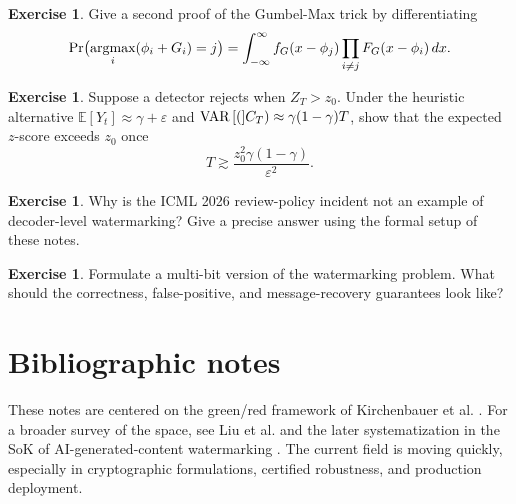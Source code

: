 \documentclass[11pt]{article}
\theoremstyle{definition}
\newtheorem{exercise}[theorem]{Exercise}
\newcommand{\PrK}{\Pr}
\newcommand{\E}{\mathbb{E}}
\newcommand{\1}{\mathbf{1}}
\begin{document}
\begin{exercise}
Give a second proof of the Gumbel-Max trick by differentiating
\[
\PrK\bigl(\argmax_i (\phi_i+G_i)=j\bigr)
= \int_{-\infty}^{\infty} f_G(x-\phi_j) \prod_{i\ne j} F_G(x-\phi_i)\,dx.
\]
\end{exercise}

\begin{exercise}
Suppose a detector rejects when $Z_T > z_0$. Under the heuristic alternative $\E[Y_t]\approx \gamma+\varepsilon$ and $\Var(C_T)\approx \gamma(1-\gamma)T$, show that the expected $z$-score exceeds $z_0$ once
\[
T \gtrsim \frac{z_0^2\gamma(1-\gamma)}{\varepsilon^2}.
\]
\end{exercise}

\begin{exercise}
Why is the ICML 2026 review-policy incident not an example of decoder-level watermarking? Give a precise answer using the formal setup of these notes.
\end{exercise}

\begin{exercise}
Formulate a multi-bit version of the watermarking problem. What should the correctness, false-positive, and message-recovery guarantees look like?
\end{exercise}

\section{Bibliographic notes}

These notes are centered on the green/red framework of Kirchenbauer et al. \cite{kirchenbauer2023watermark}. For a broader survey of the space, see Liu et al. \cite{liu2024survey} and the later systematization in the SoK of AI-generated-content watermarking \cite{ren2024sok}. The current field is moving quickly, especially in cryptographic formulations, certified robustness, and production deployment.
\end{document}
